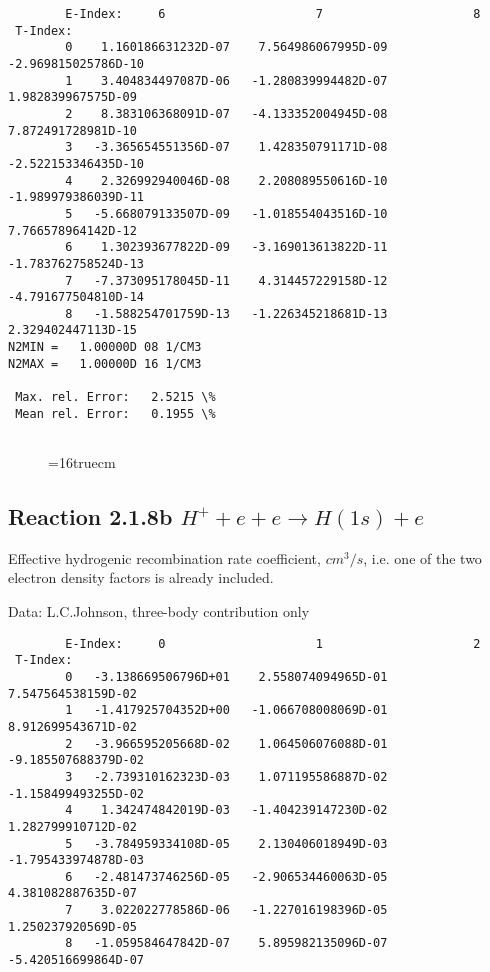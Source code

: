 \documentclass[12pt,dvipdfmx]{article}
\begin{document}
{\begin{small}
\begin{verbatim}
        E-Index:     6                     7                     8
 T-Index:
        0    1.160186631232D-07    7.564986067995D-09   -2.969815025786D-10
        1    3.404834497087D-06   -1.280839994482D-07    1.982839967575D-09
        2    8.383106368091D-07   -4.133352004945D-08    7.872491728981D-10
        3   -3.365654551356D-07    1.428350791171D-08   -2.522153346435D-10
        4    2.326992940046D-08    2.208089550616D-10   -1.989979386039D-11
        5   -5.668079133507D-09   -1.018554043516D-10    7.766578964142D-12
        6    1.302393677822D-09   -3.169013613822D-11   -1.783762758524D-13
        7   -7.373095178045D-11    4.314457229158D-12   -4.791677504810D-14
        8   -1.588254701759D-13   -1.226345218681D-13    2.329402447113D-15
N2MIN =   1.00000D 08 1/CM3
N2MAX =   1.00000D 16 1/CM3

 Max. rel. Error:   2.5215 \%
 Mean rel. Error:   0.1955 \%


\end{verbatim}\end{small}
\begin{figure} \label{2.1.8a}
\epsfxsize=16truecm
\end{figure}
\newpage

\subsection{
  Reaction 2.1.8b  $H^+ + e + e \rightarrow H(1s) + e$
}

   Effective hydrogenic recombination rate coefficient, $cm^3/s$,
   i.e. one of the two electron density factors is already included.

   Data: L.C.Johnson, three-body contribution only



\begin{small}\begin{verbatim}
        E-Index:     0                     1                     2
 T-Index:
        0   -3.138669506796D+01    2.558074094965D-01    7.547564538159D-02
        1   -1.417925704352D+00   -1.066708008069D-01    8.912699543671D-02
        2   -3.966595205668D-02    1.064506076088D-01   -9.185507688379D-02
        3   -2.739310162323D-03    1.071195586887D-02   -1.158499493255D-02
        4    1.342474842019D-03   -1.404239147230D-02    1.282799910712D-02
        5   -3.784959334108D-05    2.130406018949D-03   -1.795433974878D-03
        6   -2.481473746256D-05   -2.906534460063D-05    4.381082887635D-07
        7    3.022022778586D-06   -1.227016198396D-05    1.250237920569D-05
        8   -1.059584647842D-07    5.895982135096D-07   -5.420516699864D-07


\end{verbatim}
\end{small}}
\end{document}
